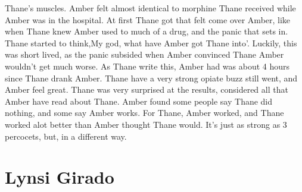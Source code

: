 \documentclass[12pt]{book}
\begin{document}
Thane's muscles. Amber felt almost identical to morphine Thane received while Amber was in the hospital. At first Thane got that felt come over Amber, like when Thane knew Amber used to much of a drug, and the panic that sets in. Thane started to think,My god, what have Amber got Thane into'. Luckily, this was short lived, as the panic subsided when Amber convinced Thane Amber wouldn't get much worse. As Thane write this, Amber had was about 4 hours since Thane drank Amber. Thane have a very strong opiate buzz still went, and Amber feel great. Thane was very surprised at the results, considered all that Amber have read about Thane. Amber found some people say Thane did nothing, and some say Amber works. For Thane, Amber worked, and Thane worked alot better than Amber thought Thane would. It's just as strong as 3 percocets, but, in a different way.



\chapter{Lynsi Girado}
\end{document}
